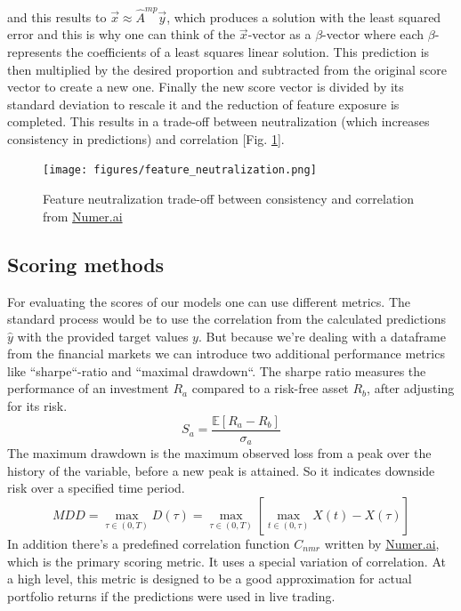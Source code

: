 \documentclass[12pt, a4paper]{article}
\begin{document}
and this results to $\vec{x} \approx \hat{A}^{mp} \vec{y}$, which produces a solution with the least squared error and this is why one can think of the $\vec{x}$-vector as a $\beta$-vector where each $\beta$- represents the coefficients of a least squares linear solution. This prediction is then multiplied by the desired proportion and subtracted from the original score vector to create a new one. Finally the new score vector is divided by its standard deviation to rescale it and the reduction of feature exposure is completed. This results in a trade-off between neutralization (which increases consistency in predictions) and correlation [Fig. \ref{fig: feature_neutral}].
\begin{figure}[!htpb]
    \centering
    \texttt{[image: figures/feature\_neutralization.png]}
    \caption[Feature neutralization trade-off]{Feature neutralization trade-off between consistency and correlation from \href{https://forum.numer.ai/t/an-introduction-to-feature-neutralization-exposure/4955}{Numer.ai}}
    \label{fig: feature_neutral}    
\end{figure}
\newpage
\subsection{Scoring methods}
For evaluating the scores of our models one can use different metrics. The standard process would be to use the correlation from the calculated predictions $\hat{y}$ with the provided target values $y$. But because we're dealing with a dataframe from the financial markets we can introduce two additional performance metrics like ``sharpe``-ratio and ``maximal drawdown``. The sharpe ratio measures the performance of an investment $R_a$ compared to a risk-free asset $R_b$, after adjusting for its risk.
\begin{equation}
    \label{eq: sharpe_ratio}
    S_a = \frac{\mathbb{E}[R_a - R_b]}{\sigma_a}
\end{equation}
The maximum drawdown is the maximum observed loss from a peak over the history of the variable, before a new peak is attained. So it indicates downside risk over a specified time period.
\begin{equation}
\label{eq: mdd}
    MDD = \underset{\tau \in (0,T)}{\max} D(\tau) =  \underset{\tau \in (0,T)}{\max} [ \underset{t \in (0,\tau)}{\max} X(t) - X(\tau)]
\end{equation}
In addition there's a predefined correlation function $C_{nmr}$ written by \href{https://docs.numer.ai/numerai-tournament/scoring/correlation-corr}{Numer.ai}, which is the primary scoring metric. It uses a special variation of correlation. At a high level, this metric is designed to be a good approximation for actual portfolio returns if the predictions were used in live trading. \\
\newpage
\end{document}
